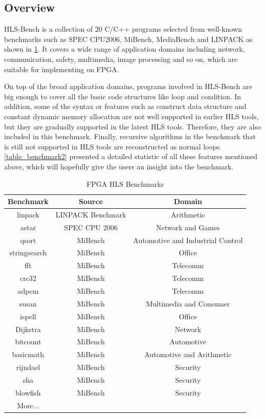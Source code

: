 \documentclass[conference]{IEEEtran}
\begin{document}
\subsection{Overview}
HLS-Bench is a collection of 20 C/C++ programs selected from well-known benchmarks such as SPEC CPU2006, MiBench, MediaBench and LINPACK as shown in \ref{table_benchmark}. It covers a wide range of application domains including network, communication, safety, multimedia, image processing and so on, which are suitable for implementing on FPGA.  

On top of the broad application domains, programs involved in HLS-Bench are big enough to cover all the basic code structures like loop and condition. In addition, some of the syntax or features such as construct data structure and constant dynamic memory allocation are not well supported in earlier HLS tools, but they are gradually supported in the latest HLS tools. Therefore, they are also included in this benchmark. Finally, recursive algorithms in the benchmark that is still not supported in HLS tools are reconstructed as normal loops. \ref{table_benchmark2} presented a detailed statistic of all these features mentioned above, which will hopefully give the users an insight into the benchmark. 

\begin{table}
\caption{FPGA HLS Benchmarks}\label{table_benchmark}
\begin{tabular}{|c|c|c|}
\hline
Benchmark  & Source & Domain\tabularnewline
\hline
\hline
linpack & LINPACK Benchmark & Arithmetic\tabularnewline
\hline
astar & SPEC CPU 2006 & Network and Games\tabularnewline
\hline
qsort & MiBench & Automotive and Industrial Control\tabularnewline
\hline
stringsearch & MiBench & Office\tabularnewline
\hline
fft & MiBench & Telecomm\tabularnewline
\hline
crc32 & MiBench & Telecomm\tabularnewline
\hline
adpcm  & MiBench & Telecomm\tabularnewline
\hline
susan & MiBench & Multimedia and Consumer\tabularnewline
\hline
ispell & MiBench & Office\tabularnewline
\hline
Dijkstra & MiBench & Network\tabularnewline
\hline
bitcount & MiBench & Automotive\tabularnewline
\hline
basicmath & MiBench & Automotive and Arithmetic\tabularnewline
\hline
rijndael & MiBench & Security\tabularnewline
\hline
sha & MiBench & Security\tabularnewline
\hline
blowfish & MiBench & Security\tabularnewline
\hline
More... &  & \tabularnewline
\hline
\end{tabular}
\end{table}
\end{document}
